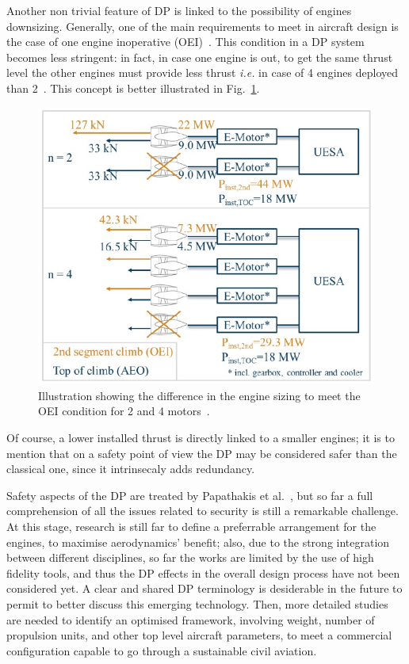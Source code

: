 Another non trivial feature of DP is linked to the possibility of engines downsizing. 
Generally, one of the main requirements to meet in aircraft design is the case of one engine inoperative (OEI)~\cite{bib:roskam_partI}.
This condition in a DP system becomes less stringent: in fact, in case one engine is out, to get the same thrust level the other engines must provide less thrust \textit{i.e.} in case of 4 engines deployed than 2~\cite{bib:steiner}. 
This concept is better illustrated in Fig.~\ref{fig:oei_condition}.   
\begin{figure}[h!]
	\centering
	\includegraphics[keepaspectratio, width=0.5\linewidth]{images/chap1/oei_condition.jpg}
	\caption{Illustration showing the difference in the engine sizing to meet the OEI condition for 2 and 4 motors~\cite{bib:steiner}.}
	\label{fig:oei_condition}
\end{figure}
Of course, a lower installed thrust is directly linked to a smaller engines; it is to mention that on a safety point of view the DP may be considered safer than the classical one, since it intrinsecaly adds redundancy. 

Safety aspects of the DP are treated by Papathakis et al.~\cite{bib:papathakis}, but so far a full comprehension of all the issues related to security is still a remarkable challenge.
At this stage, research is still far to define a preferrable arrangement for the engines, to maximise aerodynamics' benefit; also, due to the strong integration between different disciplines, so far the works are limited by the use of high fidelity tools, and thus the DP effects in the overall design process have not been considered yet. 
A clear and shared DP terminology is desiderable in the future to permit to better discuss this emerging technology.
Then, more detailed studies are needed to identify an optimised framework, involving weight, number of propulsion units, and other top level aircraft parameters, to meet a commercial configuration capable to go through a sustainable civil aviation. 

